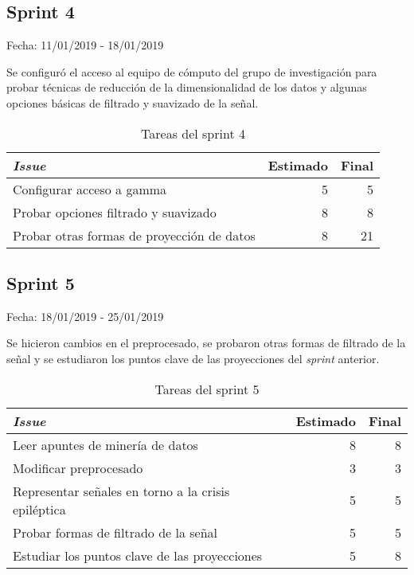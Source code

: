 \subsection{Sprint 4}

Fecha: 11/01/2019 - 18/01/2019

Se configuró el acceso al equipo de cómputo del grupo de investigación para probar técnicas de reducción de la dimensionalidad de los datos y algunas opciones básicas de filtrado y suavizado de la señal. 

\begin{table}[H]
	\begin{tabularx}{\textwidth}{Xrr}
		\toprule \textbf{\textit{Issue}} & \textbf{Estimado} & \textbf{Final}\\
		\toprule
		Configurar acceso a gamma & 5 & 5 \\
		Probar opciones filtrado y suavizado & 8 & 8 \\
		Probar otras formas de proyección de datos & 8 & 21 \\
		\bottomrule
	\end{tabularx}
	\caption{Tareas del sprint 4}
\end{table}

\subsection{Sprint 5}

Fecha: 18/01/2019 - 25/01/2019

Se hicieron cambios en el preprocesado, se probaron otras formas de filtrado de la señal y se estudiaron los puntos clave de las proyecciones del \textit{sprint} anterior. 

\begin{table}[H]
	\begin{tabularx}{\textwidth}{Xrr}
		\toprule \textbf{\textit{Issue}} & \textbf{Estimado} & \textbf{Final}\\
		\toprule
		Leer apuntes de minería de datos & 8 & 8 \\
		Modificar preprocesado & 3 & 3 \\
		Representar señales en torno a la crisis epiléptica & 5 & 5 \\
		Probar formas de filtrado de la señal & 5 & 5 \\
		Estudiar los puntos clave de las proyecciones & 5 & 8 \\
		\bottomrule
	\end{tabularx}
	\caption{Tareas del sprint 5}
\end{table}


